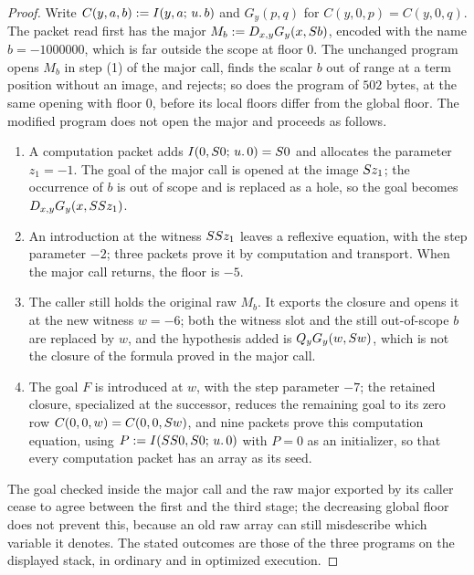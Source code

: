 \begin{proof}
Write $C(y,a,b)\mathrel{:=}I(y,a;\,u.\,b)$ and $G_y(p,q)$ for
$C(y,0,p)=C(y,0,q)$. The packet read first has the major
$M_b\mathrel{:=}D_{x,y}G_y(x,S b)$, encoded with the name $b=-1000000$, which is
far outside the scope at floor $0$. The unchanged program opens $M_b$ in
step (1) of the major call, finds the scalar $b$ out of range at a term
position without an image, and rejects; so does the program of $502$ bytes, at
the same opening with floor $0$, before its local floors differ from the
global floor. The modified program does not open the major and proceeds as
follows.
\begin{enumerate}
\item A computation packet adds $I(0,S 0;\,u.\,0)=S 0$ and allocates
the parameter $z_1=-1$. The goal of the major call is opened at the image
$S z_1$; the occurrence of $b$ is out of scope and is replaced as a hole,
so the goal becomes $D_{x,y}G_y(x,SS z_1)$.
\item An introduction at the witness $SS z_1$ leaves a reflexive
equation, with the step parameter $-2$; three packets prove it by computation
and transport. When the major call returns, the floor is $-5$.
\item The caller still holds the original raw $M_b$. It exports the closure
and opens it at the new witness $w=-6$; both the witness slot and the still
out-of-scope $b$ are replaced by $w$, and the hypothesis added is
$Q_{y}G_y(w,S w)$, which is not the closure of the formula proved in the
major call.
\item The goal $F$ is introduced at $w$, with the step parameter $-7$; the
retained closure, specialized at the successor, reduces the remaining goal to
its zero row $C(0,0,w)=C(0,0,S w)$, and nine packets prove this
computation equation, using $P\mathrel{:=}I(SS 0,S 0;\,u.\,0)$ with $P=0$
as an initializer, so that every computation packet has an array as its seed.
\end{enumerate}
The goal checked inside the major call and the raw major exported by its
caller cease to agree between the first and the third stage; the decreasing
global floor does not prevent this, because an old raw array can still
misdescribe which variable it denotes. The stated outcomes are those of the
three programs on the displayed stack, in ordinary and in optimized
execution.
\end{proof}

